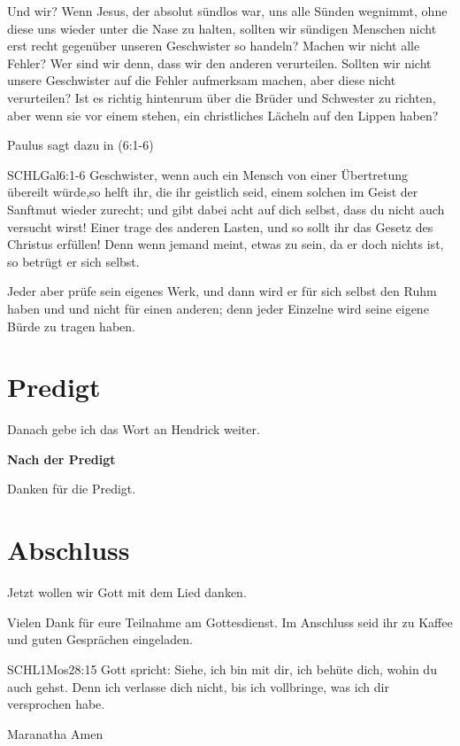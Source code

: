\documentclass{../../inc/mybib}
\begin{document}
\begin{spacing}{1.5}
Und wir? Wenn Jesus, der absolut sündlos war, uns alle Sünden wegnimmt, ohne diese uns wieder unter die Nase zu halten, sollten wir sündigen Menschen nicht erst recht gegenüber unseren Geschwister so handeln? Machen wir nicht alle Fehler? Wer sind wir denn, dass wir den anderen verurteilen. Sollten wir nicht unsere Geschwister auf die Fehler aufmerksam machen, aber diese nicht verurteilen? Ist es richtig hintenrum über die Brüder und Schwester zu richten, aber wenn sie vor einem stehen, ein christliches Lächeln auf den Lippen haben? 

Paulus sagt dazu in (6:1-6)
\begin{bibeltext}{SCHL}{Gal}{6:1-6}
    Geschwister, wenn auch ein Mensch von einer Übertretung übereilt würde,so helft ihr, die ihr geistlich seid, einem solchen im Geist der Sanftmut wieder zurecht; und gibt dabei acht auf dich selbst, dass du nicht auch versucht wirst! Einer trage des anderen Lasten, und so sollt ihr das Gesetz des Christus erfüllen! Denn wenn jemand meint, etwas zu sein, da er doch nichts ist, so betrügt er sich selbst.

    Jeder aber prüfe sein eigenes Werk, und dann wird er für sich selbst den Ruhm haben und und nicht für einen anderen; denn jeder Einzelne wird seine eigene Bürde zu tragen haben.
\end{bibeltext}
\end{spacing}

\section{Predigt}

Danach gebe ich das Wort an Hendrick weiter.

\textbf{Nach der Predigt}

Danken für die Predigt.






\section{Abschluss}

Jetzt wollen wir Gott mit dem Lied  danken.

Vielen Dank für eure Teilnahme am Gottesdienst. Im Anschluss seid ihr zu Kaffee und guten Gesprächen eingeladen.
\beten{}

\begin{bibelbox}{SCHL}{1Mos}{28:15}
Gott spricht: Siehe, ich bin mit dir,
ich behüte dich, wohin du auch gehst.
Denn ich verlasse dich nicht,
bis ich vollbringe, was ich dir versprochen habe.
\end{bibelbox}

Maranatha Amen
\end{document}

